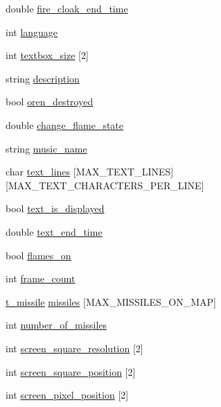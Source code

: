 \begin{DoxyCompactItemize}
\item 
double \hyperlink{classc__map_a38c8548138806d350a13fc6ace496d14}{fire\-\_\-cloak\-\_\-end\-\_\-time}
\item 
int \hyperlink{classc__map_af60c23046dcafb3b9c4a3e097f9e586e}{language}
\item 
int \hyperlink{classc__map_a2c290e7b1d47f8c846fc77aa4464c8e7}{textbox\-\_\-size} \mbox{[}2\mbox{]}
\item 
string \hyperlink{classc__map_ad1b2ee98d03858d529bf35854473ecc6}{description}
\item 
bool \hyperlink{classc__map_af471bb004fc765a15293604a0830bca2}{oren\-\_\-destroyed}
\item 
double \hyperlink{classc__map_af7ac20f46aab8dde2b4459642fd5d3de}{change\-\_\-flame\-\_\-state}
\item 
string \hyperlink{classc__map_aeab133fe9c418a16af900492f8bf49a4}{music\-\_\-name}
\item 
char \hyperlink{classc__map_a97c58015fb3e1e4764d6a522880c5ccf}{text\-\_\-lines} \mbox{[}M\-A\-X\-\_\-\-T\-E\-X\-T\-\_\-\-L\-I\-N\-E\-S\mbox{]}\mbox{[}M\-A\-X\-\_\-\-T\-E\-X\-T\-\_\-\-C\-H\-A\-R\-A\-C\-T\-E\-R\-S\-\_\-\-P\-E\-R\-\_\-\-L\-I\-N\-E\mbox{]}
\item 
bool \hyperlink{classc__map_a6273cd823e9d08f0b277e6407b468ff3}{text\-\_\-is\-\_\-displayed}
\item 
double \hyperlink{classc__map_ad911699c6d1ad83868e75551d138b4e7}{text\-\_\-end\-\_\-time}
\item 
bool \hyperlink{classc__map_a42c18f1bd057c4dcd88ec2de95c854fe}{flames\-\_\-on}
\item 
int \hyperlink{classc__map_ae7f6ee0b7e9f43cf0344d55480595803}{frame\-\_\-count}
\item 
\hyperlink{structt__missile}{t\-\_\-missile} \hyperlink{classc__map_a7a421fc457cc901876cc7e8d0fbc13e8}{missiles} \mbox{[}M\-A\-X\-\_\-\-M\-I\-S\-S\-I\-L\-E\-S\-\_\-\-O\-N\-\_\-\-M\-A\-P\mbox{]}
\item 
int \hyperlink{classc__map_a83302b5feea5bc2e3e9bc10efa23396f}{number\-\_\-of\-\_\-missiles}
\item 
int \hyperlink{classc__map_af760f25a8a9a58ce904ac0f0b3ee6887}{screen\-\_\-square\-\_\-resolution} \mbox{[}2\mbox{]}
\item 
int \hyperlink{classc__map_a2b6fac3ee312a52883ab9ff692dbaf0b}{screen\-\_\-square\-\_\-position} \mbox{[}2\mbox{]}
\item 
int \hyperlink{classc__map_afa78589723b061e99ecfe9f7ae9a5fdd}{screen\-\_\-pixel\-\_\-position} \mbox{[}2\mbox{]}

\end{DoxyCompactItemize}
